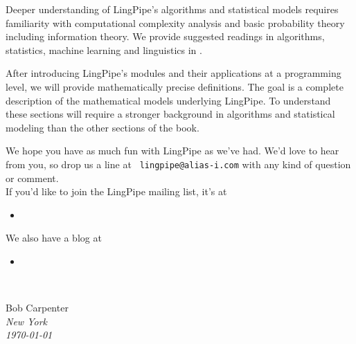 Deeper understanding of LingPipe's algorithms and statistical models
requires familiarity with computational complexity analysis and basic
probability theory including information theory.  We provide suggested
readings in algorithms, statistics, machine learning and linguistics
in .

After introducing LingPipe's modules and their applications at a
programming level, we will provide mathematically precise definitions.
The goal is a complete description of the mathematical models
underlying LingPipe.  To understand these sections will require a
stronger background in algorithms and statistical modeling than
the other sections of the book.

We hope you have as much fun with LingPipe as we've had.
We'd love to hear from you, so drop us a line at {\tt
lingpipe@alias-i.com} with any kind of question or comment.
\\[12pt]
If you'd like to join the LingPipe mailing list, it's at
\begin{itemize}
\item
{}
\end{itemize}
%
We also have a blog at
\begin{itemize}
\item
{}
\end{itemize}



\newlength{\sigWidth}
\mbox{ }
\hfill
\parbox{\sigWidth}{
Bob Carpenter
\\[2pt]\small
\it New York
\\
\today}
